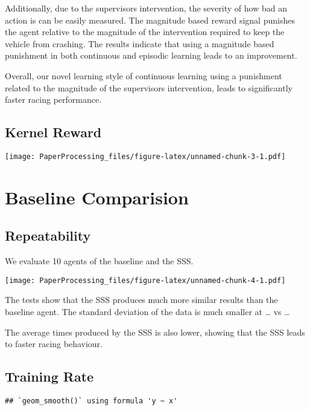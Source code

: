 \documentclass[
]{article}
\begin{document}
Additionally, due to the supervisors intervention, the severity of how
bad an action is can be easily measured. The magnitude based reward
signal punishes the agent relative to the magnitude of the intervention
required to keep the vehicle from crashing. The results indicate that
using a magnitude based punishment in both continuous and episodic
learning leads to an improvement.

Overall, our novel learning style of continuous learning using a
punishment related to the magnitude of the supervisors intervention,
leads to significantly faster racing performance.

\hypertarget{kernel-reward}{%
\subsection{Kernel Reward}\label{kernel-reward}}

\texttt{[image: PaperProcessing\_files/figure-latex/unnamed-chunk-3-1.pdf]}

\hypertarget{baseline-comparision}{%
\section{Baseline Comparision}\label{baseline-comparision}}

\hypertarget{repeatability}{%
\subsection{Repeatability}\label{repeatability}}

We evaluate 10 agents of the baseline and the SSS.

\texttt{[image: PaperProcessing\_files/figure-latex/unnamed-chunk-4-1.pdf]}

The tests show that the SSS produces much more similar results than the
baseline agent. The standard deviation of the data is much smaller at
\ldots{} vs \ldots{}

The average times produced by the SSS is also lower, showing that the
SSS leads to faster racing behaviour.

\hypertarget{training-rate}{%
\subsection{Training Rate}\label{training-rate}}

\begin{verbatim}
## `geom_smooth()` using formula 'y ~ x'
\end{verbatim}
\end{document}
